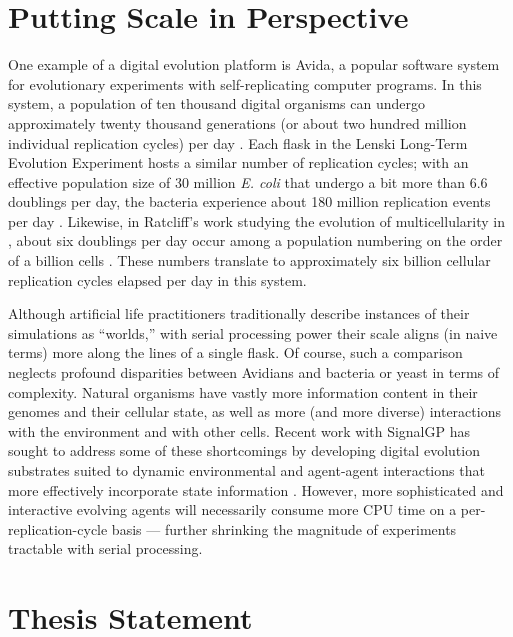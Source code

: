 \section{Putting Scale in Perspective}

One example of a digital evolution platform is Avida, a popular software system for evolutionary experiments with self-replicating computer programs.
In this system, a population of ten thousand digital organisms can undergo approximately twenty thousand generations (or about two hundred million individual replication cycles) per day \citep{ofria2009artificial}.
Each flask in the Lenski Long-Term Evolution Experiment hosts a similar number of replication cycles; with an effective population size of 30 million \textit{E. coli} that undergo a bit more than 6.6 doublings per day, the bacteria experience about 180 million replication events per day \citep{good2017dynamics}.
Likewise, in Ratcliff’s work studying the evolution of multicellularity in , about six doublings per day occur among a population numbering on the order of a billion cells \citep{ratcliff2012experimental}.
These numbers translate to approximately six billion cellular replication cycles elapsed per day in this system.

Although artificial life practitioners traditionally describe instances of their simulations as ``worlds,'' with serial processing power their scale aligns (in naive terms) more along the lines of a single flask.
Of course, such a comparison neglects profound disparities between Avidians and bacteria or yeast in terms of complexity.
Natural organisms have vastly more information content in their genomes and their cellular state, as well as more (and more diverse) interactions with the environment and with other cells.
Recent work with SignalGP has sought to address some of these shortcomings by developing digital evolution substrates suited to dynamic environmental and agent-agent interactions \citep{lalejini2018evolving} that more effectively incorporate state information \citep{lalejini2021tag,lalejini2020case, moreno2019evaluating}.
However, more sophisticated and interactive evolving agents will necessarily consume more CPU time on a per-replication-cycle basis --- further shrinking the magnitude of experiments tractable with serial processing.

\section{Thesis Statement}

